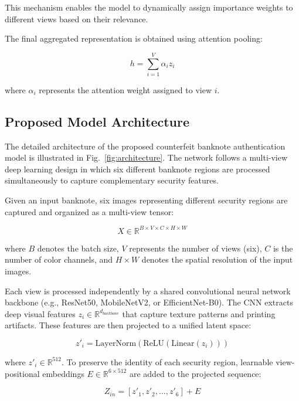\documentclass[preprint,12pt,authoryear]{elsarticle}
\begin{document}
This mechanism enables the model to dynamically assign importance weights to different views based on their relevance.

The final aggregated representation is obtained using attention pooling:

\begin{equation}
h = \sum_{i=1}^{V} \alpha_i z_i
\end{equation}

where $\alpha_i$ represents the attention weight assigned to view $i$.

\subsection{Proposed Model Architecture}

The detailed architecture of the proposed counterfeit banknote authentication model is illustrated in Fig.~\ref{fig:architecture}. The network follows a multi-view deep learning design in which six different banknote regions are processed simultaneously to capture complementary security features.

Given an input banknote, six images representing different security regions are captured and organized as a multi-view tensor:

\begin{equation}
X \in \mathbb{R}^{B \times V \times C \times H \times W}
\end{equation}

where $B$ denotes the batch size, $V$ represents the number of views (six), $C$ is the number of color channels, and $H \times W$ denotes the spatial resolution of the input images.

Each view is processed independently by a shared convolutional neural network backbone (e.g., ResNet50, MobileNetV2, or EfficientNet-B0). The CNN extracts deep visual features $z_i \in \mathbb{R}^{d_{backbone}}$ that capture texture patterns and printing artifacts. These features are then projected to a unified latent space:

\begin{equation}
z'_i = \text{LayerNorm}(\text{ReLU}(\text{Linear}(z_i)))
\end{equation}

where $z'_i \in \mathbb{R}^{512}$. To preserve the identity of each security region, learnable view-positional embeddings $E \in \mathbb{R}^{6 \times 512}$ are added to the projected sequence:

\begin{equation}
Z_{in} = [z'_1, z'_2, \dots, z'_6] + E
\end{equation}
\end{document}
